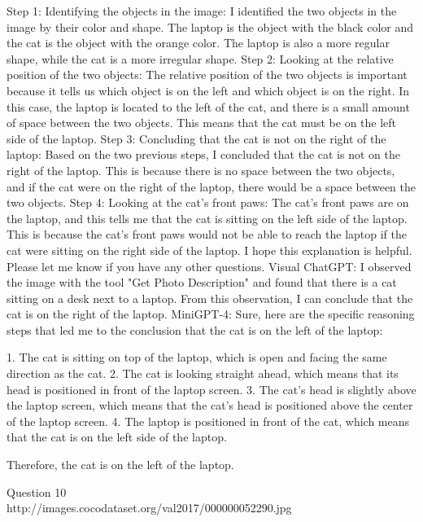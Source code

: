 \begin{enumerate}
        Step 1: Identifying the objects in the image: I identified the two objects in the image by their color and shape. The laptop is the object with the black color and the cat is the object with the orange color. The laptop is also a more regular shape, while the cat is a more irregular shape.
        Step 2: Looking at the relative position of the two objects: The relative position of the two objects is important because it tells us which object is on the left and which object is on the right. In this case, the laptop is located to the left of the cat, and there is a small amount of space between the two objects. This means that the cat must be on the left side of the laptop.
        Step 3: Concluding that the cat is not on the right of the laptop: Based on the two previous steps, I concluded that the cat is not on the right of the laptop. This is because there is no space between the two objects, and if the cat were on the right of the laptop, there would be a space between the two objects.
        Step 4: Looking at the cat's front paws: The cat's front paws are on the laptop, and this tells me that the cat is sitting on the left side of the laptop. This is because the cat's front paws would not be able to reach the laptop if the cat were sitting on the right side of the laptop.
        I hope this explanation is helpful. Please let me know if you have any other questions.
        \subitem Visual ChatGPT: I observed the image with the tool "Get Photo Description" and found that there is a cat sitting on a desk next to a laptop. From this observation, I can conclude that the cat is on the right of the laptop.
        \subitem MiniGPT-4: Sure, here are the specific reasoning steps that led me to the conclusion that the cat is on the left of the laptop:

        1. The cat is sitting on top of the laptop, which is open and facing the same direction as the cat.
        2. The cat is looking straight ahead, which means that its head is positioned in front of the laptop screen.
        3. The cat’s head is slightly above the laptop screen, which means that the cat’s head is positioned above the center of the laptop screen.
        4. The laptop is positioned in front of the cat, which means that the cat is on the left side of the laptop.
        
        Therefore, the cat is on the left of the laptop.
    \end{enumerate}
Question 10\\
http://images.cocodataset.org/val2017/000000052290.jpg
